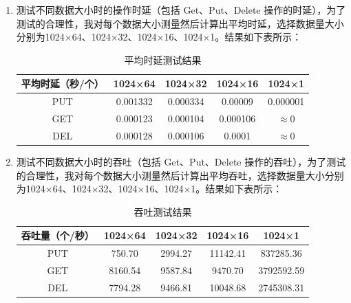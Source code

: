 \documentclass[UTF8]{ctexart}
\begin{document}
\begin{enumerate}
    \item 测试不同数据大小时的操作时延（包括 Get、Put、Delete 操作的时延），为了测试的合理性，我对每个数据大小测量然后计算出平均时延，选择数据量大小分别为1024×64、1024×32、1024×16、1024×1。结果如下表所示：
    \begin{table}[h]
        \centering
        \begin{tabular}{|c|c|c|c|c|}
            \hline
            平均时延（秒/个）&	1024×64&	1024×32&	1024×16&	1024×1\\
            \hline
            PUT&	0.001332&	0.000334&	0.00009&	0.000001\\
            \hline
            GET&	0.000123&	0.000104&	0.000106&	$\approx$0\\
            \hline
            DEL&	0.000128&	0.000106&	0.0001&	    $\approx$0\\
            \hline
        \end{tabular}
        \caption{平均时延测试结果}
    \end{table}
    
    \item 测试不同数据大小时的吞吐（包括 Get、Put、Delete 操作的吞吐），为了测试的合理性，我对每个数据大小测量然后计算出平均吞吐，选择数据量大小分别为1024×64、1024×32、1024×16、1024×1。结果如下表所示：
    \begin{table}[h]
        \centering
        \begin{tabular}{|c|c|c|c|c|}
            \hline
            吞吐量（个/秒）&	1024×64&	1024×32&	1024×16&	1024×1\\
            \hline
            PUT&	750.70&	    2994.27&	11142.41&	837285.36\\
            \hline
            GET&	8160.54&	9587.84&	    9470.70&	3792592.59\\
            \hline
            DEL&	7794.28&	9466.81&	10048.68&	2745308.31\\
            \hline
        \end{tabular}
        \caption{吞吐测试结果}
    \end{table}
\end{enumerate}
\end{document}
